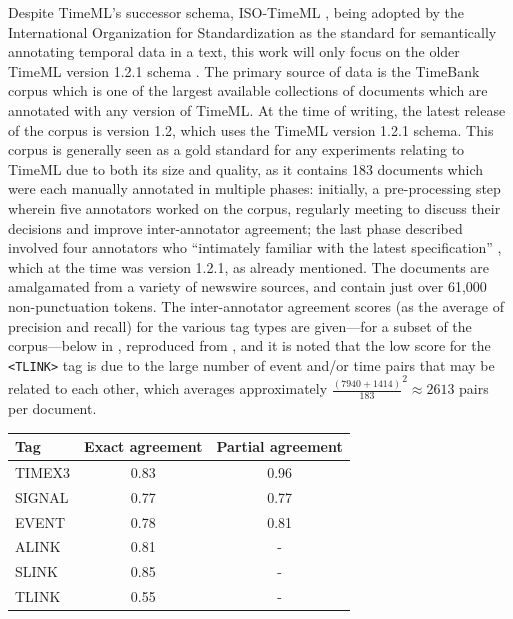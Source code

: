 \documentclass[a4paper,12pt,leqno]{article}
\begin{document}
Despite TimeML's successor schema, ISO-TimeML \citep{pustejovsky2010iso}, being adopted by the International Organization for Standardization as the standard \citep{ISO24617-1} for semantically annotating temporal data in a text, this work will only focus on the older TimeML version 1.2.1 schema \citep{timeml2005timeml,sauri2006timeml}. The primary source of data is the TimeBank corpus \citep{pustejovsky2006timebank} which is one of the largest available collections of documents which are annotated with any version of TimeML. At the time of writing, the latest release of the corpus is version 1.2, which uses the TimeML version 1.2.1 schema. This corpus is generally seen as a gold standard for any experiments relating to TimeML due to both its size and quality, as it contains 183 documents which were each manually annotated in multiple phases: initially, a pre-processing step wherein five annotators worked on the corpus, regularly meeting to discuss their decisions and improve inter-annotator agreement; the last phase described involved four annotators who ``intimately familiar with the latest specification'' \citep{timeml2005timeml}, which at the time was version 1.2.1, as already mentioned. The documents are amalgamated from a variety of newswire sources, and contain just over 61,000 non-punctuation tokens. The inter-annotator agreement scores (as the average of precision and recall) for the various tag types are given---for a subset of the corpus---below in , reproduced from \citet{timeml2005timeml}, and it is noted that the low score for the \verb|<TLINK>| tag is due to the large number of event and/or time pairs that may be related to each other, which averages approximately $\frac{(7940+1414)}{183}^2 \approx 2613$ pairs per document.
\begin{center}
	\begin{tabular}[]{|l c c|}
		\hline
		\textbf{Tag} & \textbf{Exact agreement} & \textbf{Partial agreement}\\
		\hline
		TIMEX3 & 0.83 & 0.96\\
		SIGNAL & 0.77 & 0.77\\
		EVENT & 0.78 & 0.81\\
		ALINK & 0.81 & -\\
		SLINK & 0.85 & -\\
		TLINK & 0.55 & -\\
		\hline
	\end{tabular}
	\label{fig:inter-annotator-timebank}
\end{center}
\end{document}
